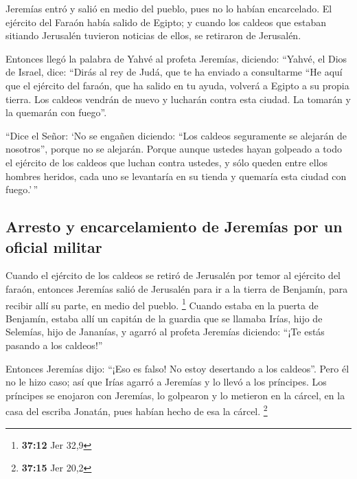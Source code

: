 \begin{paracol}{2}
 Jeremías entró y salió en medio del pueblo, pues no lo
habían encarcelado.  El ejército del Faraón había salido
de Egipto; y cuando los caldeos que estaban sitiando Jerusalén tuvieron
noticias de ellos, se retiraron de Jerusalén.

 Entonces llegó la palabra de Yahvé al profeta Jeremías,
diciendo:  ``Yahvé, el Dios de Israel, dice: ``Dirás al
rey de Judá, que te ha enviado a consultarme ``He aquí que el ejército
del faraón, que ha salido en tu ayuda, volverá a Egipto a su propia
tierra.  Los caldeos vendrán de nuevo y lucharán contra
esta ciudad. La tomarán y la quemarán con fuego''.

 ``Dice el Señor: `No se engañen diciendo: ``Los caldeos
seguramente se alejarán de nosotros'', porque no se alejarán.
 Porque aunque ustedes hayan golpeado a todo el ejército
de los caldeos que luchan contra ustedes, y sólo queden entre ellos
hombres heridos, cada uno se levantaría en su tienda y quemaría esta
ciudad con fuego.'\,''

\hypertarget{arresto-y-encarcelamiento-de-jeremuxedas-por-un-oficial-militar}{%
\subsection{Arresto y encarcelamiento de Jeremías por un oficial
militar}\label{arresto-y-encarcelamiento-de-jeremuxedas-por-un-oficial-militar}}

 Cuando el ejército de los caldeos se retiró de Jerusalén
por temor al ejército del faraón,  entonces Jeremías
salió de Jerusalén para ir a la tierra de Benjamín, para recibir allí su
parte, en medio del pueblo. \footnote{\textbf{37:12} Jer 32,9}
 Cuando estaba en la puerta de Benjamín, estaba allí un
capitán de la guardia que se llamaba Irías, hijo de Selemías, hijo de
Jananías, y agarró al profeta Jeremías diciendo: ``¡Te estás pasando a
los caldeos!''

 Entonces Jeremías dijo: ``¡Eso es falso! No estoy
desertando a los caldeos''. Pero él no le hizo caso; así que Irías
agarró a Jeremías y lo llevó a los príncipes.  Los
príncipes se enojaron con Jeremías, lo golpearon y lo metieron en la
cárcel, en la casa del escriba Jonatán, pues habían hecho de esa la
cárcel. \footnote{\textbf{37:15} Jer 20,2}

\hypertarget{jeremuxedas-interrogado-nuevamente-por-el-rey-y-llevado-de-la-cuxe1rcel-al-patio-de-la-guardia}{%
}
\end{paracol}
